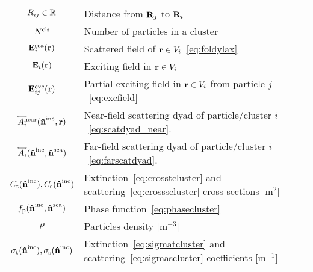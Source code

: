 \begin{table}[t]
\begin{tabular}{cl}
        $R_{ij}\in\mathbb{R}$ & Distance from $\mathbf{R}_j$ to $\mathbf{R}_i$\\
        ${N^\text{cls}}$ & Number of particles in a cluster \\
        \hline
        $\mathbf{E}^\text{sca}_i(\mathbf{r})$ & Scattered field of $\mathbf{r}\in V_i$~\eqref{eq:foldylax}\\
        $\mathbf{E}_i(\mathbf{r})$ & Exciting field in $\mathbf{r}\in V_i$ \\
        $\mathbf{E}^\text{exc}_{ij}(\mathbf{r})$ & Partial exciting field in $\mathbf{r}\in V_i$ from particle $j$~\eqref{eq:excfield} \\
        $\accentset{\Longleftrightarrow}{A}_i^\text{near}(\mathbf{\hat{n}}^{\text{inc}},\mathbf{r})$ & Near-field scattering dyad of particle/cluster $i$~\eqref{eq:scatdyad_near}. \\
        $\accentset{\Longleftrightarrow}{A}_i(\mathbf{\hat{n}}^{\text{inc}},\mathbf{\hat{n}}^{\text{sca}})$ & Far-field scattering dyad of particle/cluster $i$~\eqref{eq:farscatdyad}. \\
        \hline
        \hline
        $C_\mathrm{t}(\mathbf{\hat{n}}^{\text{inc}}),C_\mathrm{s}(\mathbf{\hat{n}}^{\text{inc}})$ & Extinction~\eqref{eq:crosstcluster} and scattering~\eqref{eq:crossscluster} cross-sections [m$^{2}$]\\
        $f_\mathrm{p}(\mathbf{\hat{n}}^{\text{inc}},\mathbf{\hat{n}}^{\text{sca}})$ & Phase function~\eqref{eq:phasecluster}\\
        $\rho$ & Particles density [m$^{-3}$] \\
        $\sigma_\mathrm{t}(\mathbf{\hat{n}}^{\text{inc}}),\sigma_\mathrm{s}(\mathbf{\hat{n}}^{\text{inc}})$ & Extinction~\eqref{eq:sigmatcluster} and scattering~\eqref{eq:sigmascluster} coefficients [m$^{-1}$]\\
        \bottomrule
    \end{tabular}
\end{table}